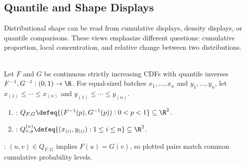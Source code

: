 \subsection{Quantile and Shape Displays}

Distributional shape can be read from cumulative displays, density displays, or quantile comparisons.  These views emphasize different questions: cumulative proportion, local concentration, and relative change between two distributions.

\begin{definition} \label{def:qq-plot} \\
Let $F$ and $G$ be continuous strictly increasing CDFs with quantile inverses $F^{-1},G^{-1}:(0,1)\to\R$. For equal-sized batches $x_1,\ldots,x_n$ and $y_1,\ldots,y_n$, let $x_{(1)}\leq\cdots\leq x_{(n)}$ and $y_{(1)}\leq\cdots\leq y_{(n)}$.
\begin{enumerate}[label=(\roman*)]
\setlength{\itemsep}{0pt}
\item {}: $Q_{F,G}\defeq\{(F^{-1}(p),G^{-1}(p)):0<p<1\}\subseteq\R^2$.
\item {}: $Q_{x,y}^{(n)}\defeq\{(x_{(i)},y_{(i)}):1\leq i\leq n\}\subseteq\R^2$.
\end{enumerate}
: $(u,v)\in Q_{F,G}$ implies $F(u)=G(v)$, so plotted pairs match common cumulative probability levels.
\end{definition}

